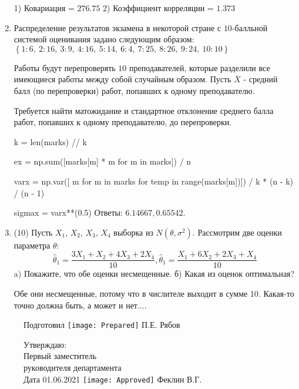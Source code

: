 \documentclass[a4paper,12pt]{article}
\begin{document}
\begin{enumerate}
1) Ковариация = $276.75$
2) Коэффициент корреляции = $1.373$


\item

    
    	Распределение результатов экзамена в некоторой стране с $10$-балльной системой оценивания задано следующим образом:
    	$\left\{ 1 : 6, \  2 : 16, \  3 : 9, \  4 : 16, \  5 : 14, \  6 : 4, \  7 : 25, \  8 : 26, \  9 : 24, \  10 : 10\right\}$

	Работы будут перепроверять $10$ преподавателей, которые разделили все имеющиеся работы между собой случайным образом. Пусть $\overline{X}$ - средний балл (по перепроверки) работ, попавших к одному преподавателю.

	Требуется найти матожидание и стандартное отклонение среднего балла работ, попавших к одному преподавателю, до перепроверки.
    


    


    k = len(marks) // k

    ex = np.sum([marks[m] * m for m in marks]) / n

    varx = np.var([ m for m in marks for temp in range(marks[m])]) / k * (n - k) / (n - 1)

    sigmax = varx**(0.5)
    Ответы: $6.14667, 0.65542$.

    

\item


(10) Пусть $X _{1}$, $X _{2}$, $X _{3}$, $X _{4}$ выборка из $N(\theta, \sigma ^{2})$. Рассмотрим две оценки параметра $\theta$:
\[\hat \theta _{1} = \frac{3X _{1} + X _{2} + 4X _{3} + 2X _{4}}{10}, \hat \theta _{1} = \frac{X _{1} + 6X _{2} + 2X _{3} + X _{4}}{10}\]
a) Покажите, что обе оценки несмещенные.
б) Какая из оценок оптимальная?




Обе они несмещенные, потому что в числителе выходит в сумме 10.
Какая-то точно должна быть, а может и нет....



\end{enumerate}

\begin{figure}[H]
	Подготовил
	\hfill
	\texttt{[image: Prepared]}
	П.Е. Рябов
\end{figure}


\begin{figure}[H]
	Утверждаю:\\
	Первый заместитель\\
	руководителя департамента\\
	Дата 01.06.2021
	\hfill
	\texttt{[image: Approved]}
	Феклин В.Г.
\end{figure}
\end{document}
